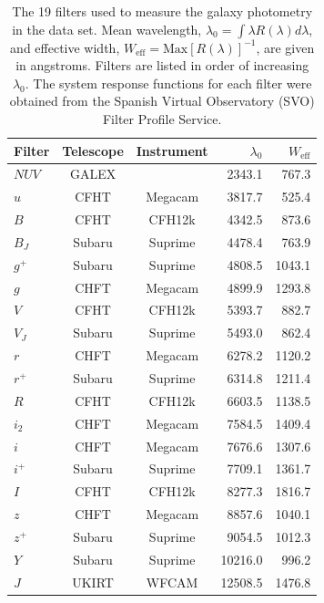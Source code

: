 \begin{table}
    \centering
    \caption{The 19 filters used to measure the galaxy photometry in the data set. Mean wavelength, $\lambda_0 = \int \lambda R(\lambda) d\lambda$, and effective width, $W_\text{eff} = \text{Max}[R(\lambda)]^{-1}$, are given in angstroms. Filters are listed in order of increasing $\lambda_0$. The system response functions for each filter were obtained from the Spanish Virtual Observatory (SVO) Filter Profile Service.}
    \begin{tabular}{l c c r r}
        \toprule \toprule
        Filter & Telescope & Instrument & $\lambda_0$ & $W_\text{eff}$ \\
        \midrule
        
        $NUV$ & GALEX  &         &  2343.1 &  767.3 \\
        $u$   & CFHT   & Megacam &  3817.7 &  525.4 \\
        $B$   & CFHT   & CFH12k  &  4342.5 &  873.6 \\
        $B_J$ & Subaru & Suprime &  4478.4 &  763.9 \\
        $g^+$ & Subaru & Suprime &  4808.5 & 1043.1 \\
        $g$   & CHFT   & Megacam &  4899.9 & 1293.8 \\
        $V$   & CFHT   & CFH12k  &  5393.7 &  882.7 \\
        $V_J$ & Subaru & Suprime &  5493.0 &  862.4 \\
        $r$   & CHFT   & Megacam &  6278.2 & 1120.2 \\
        $r^+$ & Subaru & Suprime &  6314.8 & 1211.4 \\
        $R$   & CFHT   & CFH12k  &  6603.5 & 1138.5 \\
        $i_2$ & CHFT   & Megacam &  7584.5 & 1409.4 \\
        $i$   & CHFT   & Megacam &  7676.6 & 1307.6 \\
        $i^+$ & Subaru & Suprime &  7709.1 & 1361.7 \\
        $I$   & CFHT   & CFH12k  &  8277.3 & 1816.7 \\
        $z$   & CHFT   & Megacam &  8857.6 & 1040.1 \\
        $z^+$ & Subaru & Suprime &  9054.5 & 1012.3 \\
        $Y$   & Subaru & Suprime & 10216.0 &  996.2 \\
        $J$   & UKIRT  & WFCAM   & 12508.5 & 1476.8 \\
        
        \bottomrule
    \end{tabular}
    \label{tab:filters}
\end{table}

